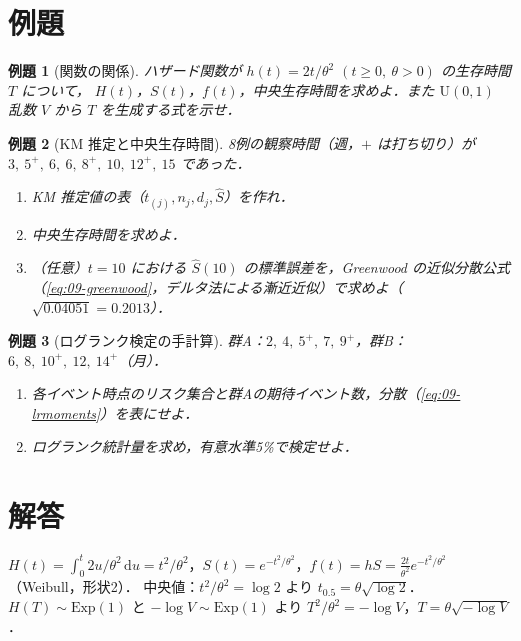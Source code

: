 \documentclass[a4paper,11pt,openany]{ltjsbook}
\newtheorem{reidai}{例題}[chapter]
\newenvironment{kaitou}[1]{%
  \par\medskip\noindent
  \begin{tcolorbox}[enhanced,breakable,colback=bkgray!3,colframe=bkgray!60,boxrule=0.4pt,
    left=4pt,right=4pt,top=2pt,bottom=2pt,arc=1pt,
    title={\cref{#1}の解答},fonttitle=\bfseries\small,coltitle=white,colbacktitle=bkgray!80]}%
  {\end{tcolorbox}\par}
\newcommand{\dd}{\mathrm{d}}
\newcommand{\Ex}{\mathrm{Exp}}
\newcommand{\Unif}{\mathrm{U}}
\begin{document}
\section{例題}\label{sec:09-ex}
\begin{reidai}[関数の関係]\label{reidai:09-1}
ハザード関数が $h(t)=2t/\theta^2$ $(t\ge0,\ \theta>0)$ の生存時間 $T$ について，
$H(t)$，$S(t)$，$f(t)$，中央生存時間を求めよ．また $\Unif(0,1)$ 乱数 $V$ から $T$ を生成する式を示せ．
\end{reidai}

\begin{reidai}[KM 推定と中央生存時間]\label{reidai:09-2}
8例の観察時間（週，$+$ は打ち切り）が $3,\ 5^+,\ 6,\ 6,\ 8^+,\ 10,\ 12^+,\ 15$ であった．
\begin{enumerate}[label=(\arabic*)]
\item KM 推定値の表（$t_{(j)},n_j,d_j,\hat S$）を作れ．
\item 中央生存時間を求めよ．
\item （任意）$t=10$ における $\hat S(10)$ の標準誤差を，Greenwood の近似分散公式（\cref{eq:09-greenwood}，デルタ法による漸近近似）で求めよ（$\sqrt{0.04051}=0.2013$）．
\end{enumerate}
\end{reidai}

\begin{reidai}[ログランク検定の手計算]\label{reidai:09-3}
群A：$2,\ 4,\ 5^+,\ 7,\ 9^+$，群B：$6,\ 8,\ 10^+,\ 12,\ 14^+$（月）．
\begin{enumerate}[label=(\arabic*)]
\item 各イベント時点のリスク集合と群Aの期待イベント数，分散（\cref{eq:09-lrmoments}）を表にせよ．
\item ログランク統計量を求め，有意水準5\%で検定せよ．
\end{enumerate}
\end{reidai}

\section{解答}\label{sec:09-sol}
\begin{kaitou}{reidai:09-1}
$H(t)=\int_0^t2u/\theta^2\,\dd u=t^2/\theta^2$，$S(t)=e^{-t^2/\theta^2}$，$f(t)=hS=\frac{2t}{\theta^2}e^{-t^2/\theta^2}$（Weibull，形状2）．
中央値：$t^2/\theta^2=\log2$ より $t_{0.5}=\theta\sqrt{\log2}$．
$H(T)\sim\Ex(1)$ と $-\log V\sim\Ex(1)$ より $T^2/\theta^2=-\log V$，$T=\theta\sqrt{-\log V}$．
\end{kaitou}
\end{document}

